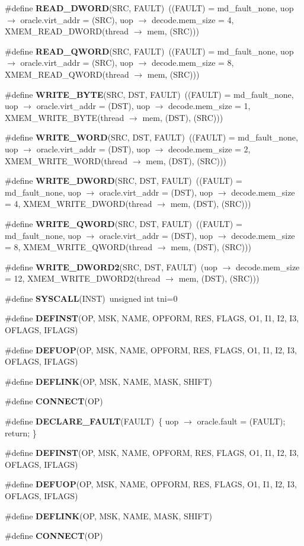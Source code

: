 \begin{CompactItemize}
\item 
\#define {\bf READ\_\-DWORD}(SRC, FAULT)~((FAULT) = md\_\-fault\_\-none, uop $\rightarrow$ oracle.virt\_\-addr = (SRC), uop $\rightarrow$ decode.mem\_\-size = 4, XMEM\_\-READ\_\-DWORD(thread $\rightarrow$ mem, (SRC)))
\item 
\#define {\bf READ\_\-QWORD}(SRC, FAULT)~((FAULT) = md\_\-fault\_\-none, uop $\rightarrow$ oracle.virt\_\-addr = (SRC), uop $\rightarrow$ decode.mem\_\-size = 8, XMEM\_\-READ\_\-QWORD(thread $\rightarrow$ mem, (SRC)))
\item 
\#define {\bf WRITE\_\-BYTE}(SRC, DST, FAULT)~((FAULT) = md\_\-fault\_\-none, uop $\rightarrow$ oracle.virt\_\-addr = (DST), uop $\rightarrow$ decode.mem\_\-size = 1, XMEM\_\-WRITE\_\-BYTE(thread $\rightarrow$ mem, (DST), (SRC)))
\item 
\#define {\bf WRITE\_\-WORD}(SRC, DST, FAULT)~((FAULT) = md\_\-fault\_\-none, uop $\rightarrow$ oracle.virt\_\-addr = (DST), uop $\rightarrow$ decode.mem\_\-size = 2, XMEM\_\-WRITE\_\-WORD(thread $\rightarrow$ mem, (DST), (SRC)))
\item 
\#define {\bf WRITE\_\-DWORD}(SRC, DST, FAULT)~((FAULT) = md\_\-fault\_\-none, uop $\rightarrow$ oracle.virt\_\-addr = (DST), uop $\rightarrow$ decode.mem\_\-size = 4, XMEM\_\-WRITE\_\-DWORD(thread $\rightarrow$ mem, (DST), (SRC)))
\item 
\#define {\bf WRITE\_\-QWORD}(SRC, DST, FAULT)~((FAULT) = md\_\-fault\_\-none, uop $\rightarrow$ oracle.virt\_\-addr = (DST), uop $\rightarrow$ decode.mem\_\-size = 8, XMEM\_\-WRITE\_\-QWORD(thread $\rightarrow$ mem, (DST), (SRC)))
\item 
\#define {\bf WRITE\_\-DWORD2}(SRC, DST, FAULT)~(uop $\rightarrow$ decode.mem\_\-size = 12, XMEM\_\-WRITE\_\-DWORD2(thread $\rightarrow$ mem, (DST), (SRC)))
\item 
\#define {\bf SYSCALL}(INST)~unsigned int tni=0
\item 
\#define {\bf DEFINST}(OP, MSK, NAME, OPFORM, RES, FLAGS, O1, I1, I2, I3, OFLAGS, IFLAGS)
\item 
\#define {\bf DEFUOP}(OP, MSK, NAME, OPFORM, RES, FLAGS, O1, I1, I2, I3, OFLAGS, IFLAGS)
\item 
\#define {\bf DEFLINK}(OP, MSK, NAME, MASK, SHIFT)
\item 
\#define {\bf CONNECT}(OP)
\item 
\#define {\bf DECLARE\_\-FAULT}(FAULT)~\{ uop $\rightarrow$ oracle.fault = (FAULT); return; \}
\item 
\#define {\bf DEFINST}(OP, MSK, NAME, OPFORM, RES, FLAGS, O1, I1, I2, I3, OFLAGS, IFLAGS)
\item 
\#define {\bf DEFUOP}(OP, MSK, NAME, OPFORM, RES, FLAGS, O1, I1, I2, I3, OFLAGS, IFLAGS)
\item 
\#define {\bf DEFLINK}(OP, MSK, NAME, MASK, SHIFT)
\item 
\#define {\bf CONNECT}(OP)
\end{CompactItemize}
